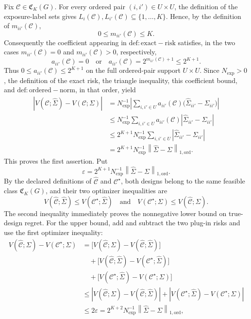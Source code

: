 Fix \(\mathcal C\in\mathfrak C_K(G)\).  For every ordered pair \((i,i')\in U\times U\), the definition of the exposure-label sets gives \(L_i(\mathcal C),L_{i'}(\mathcal C)\subseteq\{1,\ldots,K\}\).  Hence, by the definition of \(m_{ii'}(\mathcal C)\),
\[
0\le m_{ii'}(\mathcal C)\le K.
\]
Consequently the coefficient appearing in \(\mathrm{def:exact-risk}\) satisfies, in the two cases \(m_{ii'}(\mathcal C)=0\) and \(m_{ii'}(\mathcal C)>0\), respectively,
\[
a_{ii'}(\mathcal C)=0
\quad\text{or}\quad
a_{ii'}(\mathcal C)=2^{m_{ii'}(\mathcal C)+1}\le 2^{K+1}.
\]
Thus \(0\le a_{ii'}(\mathcal C)\le 2^{K+1}\) on the full ordered-pair support \(U\times U\).  Since \(N_{\exp}>0\), the definition of the exact risk, the triangle inequality, this coefficient bound, and \(\mathrm{def:ordered-norm}\), in that order, yield
\[
\begin{aligned}
\left|V(\mathcal C;\widehat\Sigma)-V(\mathcal C;\Sigma)\right|
&=N_{\exp}^{-1}\left|\sum_{i,i'\in U}a_{ii'}(\mathcal C)
       \bigl(\widehat\Sigma_{ii'}-\Sigma_{ii'}\bigr)\right|\\
&\le N_{\exp}^{-1}\sum_{i,i'\in U}a_{ii'}(\mathcal C)
       \left|\widehat\Sigma_{ii'}-\Sigma_{ii'}\right|\\
&\le 2^{K+1}N_{\exp}^{-1}\sum_{i,i'\in U}
       \left|\widehat\Sigma_{ii'}-\Sigma_{ii'}\right|\\
&=2^{K+1}N_{\exp}^{-1}
       \left\|\widehat\Sigma-\Sigma\right\|_{1,\mathrm{ord}}.
\end{aligned}
\]
This proves the first assertion.  Put
\[
\varepsilon=2^{K+1}N_{\exp}^{-1}
       \left\|\widehat\Sigma-\Sigma\right\|_{1,\mathrm{ord}}.
\]
By the declared definitions of \(\widehat{\mathcal C}\) and \(\mathcal C^\star\), both designs belong to the same feasible class \(\mathfrak C_K(G)\), and their two optimizer inequalities are
\[
V(\widehat{\mathcal C};\widehat\Sigma)
 \le V(\mathcal C^\star;\widehat\Sigma)
\quad\text{and}\quad
V(\mathcal C^\star;\Sigma)
 \le V(\widehat{\mathcal C};\Sigma).
\]
The second inequality immediately proves the nonnegative lower bound on true-design regret.  For the upper bound, add and subtract the two plug-in risks and use the first optimizer inequality:
\[
\begin{aligned}
V(\widehat{\mathcal C};\Sigma)-V(\mathcal C^\star;\Sigma)
&=\bigl[V(\widehat{\mathcal C};\Sigma)
          -V(\widehat{\mathcal C};\widehat\Sigma)\bigr]\\
&\quad+\bigl[V(\widehat{\mathcal C};\widehat\Sigma)
          -V(\mathcal C^\star;\widehat\Sigma)\bigr]\\
&\quad+\bigl[V(\mathcal C^\star;\widehat\Sigma)
          -V(\mathcal C^\star;\Sigma)\bigr]\\
&\le
 \left|V(\widehat{\mathcal C};\Sigma)
          -V(\widehat{\mathcal C};\widehat\Sigma)\right|
 +\left|V(\mathcal C^\star;\widehat\Sigma)
          -V(\mathcal C^\star;\Sigma)\right|\\
&\le 2\varepsilon
=2^{K+2}N_{\exp}^{-1}
       \left\|\widehat\Sigma-\Sigma\right\|_{1,\mathrm{ord}},
\end{aligned}
\]
